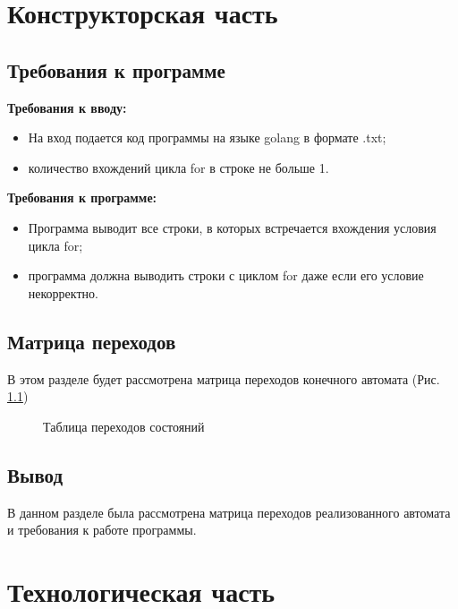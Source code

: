 \documentclass[12pt]{report}
\begin{document}
\chapter{Конструкторская часть}
\section{Требования к программе}
\textbf{Требования к вводу:}
\begin{itemize}
	\item На вход подается код программы на языке golang в формате .txt;
	\item количество вхождений цикла for в строке не больше 1.
\end{itemize}
\textbf{Требования к программе:}
\begin{itemize}
	\item Программа выводит все строки, в которых встречается вхождения условия цикла for;
	\item программа должна выводить строки с циклом for даже если его условие некорректно.
\end{itemize}
\section{Матрица переходов}
В этом разделе будет рассмотрена матрица переходов конечного автомата (Рис. \ref{fig:avt})

\begin{figure}[h]
	\caption{Таблица переходов состояний}
	\label{fig:avt}
\end{figure}

\section{Вывод}
В данном разделе была рассмотрена матрица переходов реализованного автомата и требования к работе программы.

\chapter{Технологическая часть}
\end{document}
